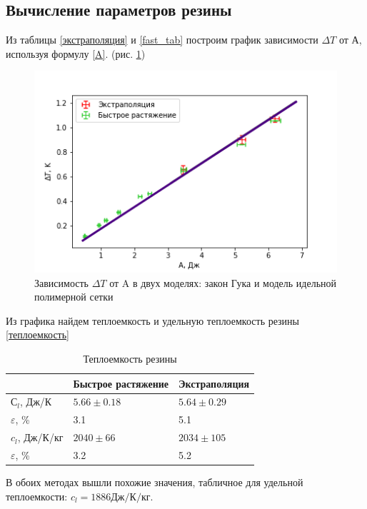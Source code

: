\documentclass[a4paper,12pt]{article} %
\begin{document}
\subsection*{Вычисление параметров резины}
Из таблицы \ref{экстраполяция} и \ref{fast_tab} построим график зависимости $\Delta T$ от А, используя формулу \ref{A}. (рис. \ref{T(A)_pic})

\begin{figure}[h!]
\begin{center}
\includegraphics[width=\textwidth]{T(A)}
\end{center}
\caption{Зависимость $\Delta T$ от A в двух моделях: закон Гука и модель идельной полимерной сетки} \label{T(A)_pic}
\end{figure}

Из графика найдем теплоемкость и удельную теплоемкость резины \ref{теплоемкость}
\begin{table}[h!]
\caption{Теплоемкость резины}
\label{Теплоемкость}
\begin{tabular}{|l|l|l|}
\hline
                  & Быстрое растяжение & Экстраполяция   \\ \hline
$С_l$, Дж/К       & $5.66 \pm 0.18$    & $5.64 \pm 0.29$ \\ \hline
$\varepsilon$, \% & 3.1                & 5.1             \\ \hline
$c_l$, Дж/К/кг    & $2040 \pm 66$    & $2034 \pm 105$ \\ \hline
$\varepsilon$, \% & 3.2                & 5.2             \\ \hline
\end{tabular}
\end{table} 

В обоих методах вышли похожие значения, табличное для удельной теплоемкости: $c_l = 1886 Дж/К/кг$.
\end{document}
